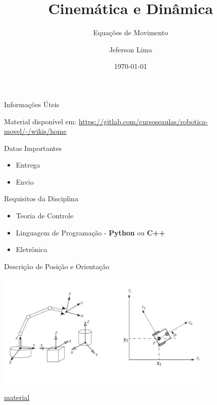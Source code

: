 \documentclass{beamer}
\title{Cinemática e Dinâmica}
\subtitle{Equações de Movimento}
\date{\today}
\author{Jeferson Lima}
\institute{\url{http://gitlab.com/jeferson.lima}}
\newcommand{\pausar}{\pause}
\begin{document}
\maketitle

\begin{frame}{Informações Úteis}
	\begin{block}{Material disponível em:}
		\href{Robótica Móvel - Wiki}{https://gitlab.com/cursoseaulas/robotica-movel/-/wikis/home}
	\end{block}
	\pausar
	\begin{block}{Datas Importantes}
		\begin{itemize}
		\item Entrega
		\item Envio
		\end{itemize}
	\end{block}
	\pausar
	\begin{block}{Requisitos da Disciplina}
		\begin{itemize}
		\item Teoria de Controle
		\item Linguagem de Programação - \textbf{Python} ou \textbf{C++}
		\item Eletrônica
		\end{itemize}
	\end{block}
\end{frame}

\begin{frame}{Descrição de Posição e Orientação}
\begin{center}
    \includegraphics[width=0.8\textwidth]{images/mecanismos.jpg}
\end{center}

\href{http://www.joinville.ifsc.edu.br/~michael.klug/ROB74/Aulas/aula2_trans_geometricas.pdf
}{material}

\end{frame}
\end{document}
